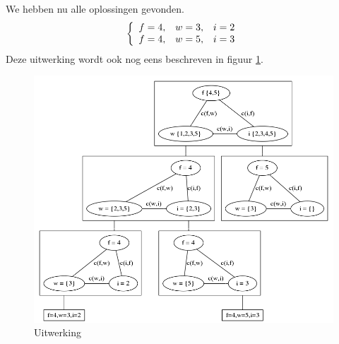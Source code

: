 \documentclass[alternative-exam.tex]{subfiles}
\begin{document}
We hebben nu alle oplossingen gevonden.
\[
\left\lbrace
\begin{array}{c c c}
f=4,& w=3,& i=2\\
f=4,& w=5,& i=3\\
\end{array}
\right.
\] 
Deze uitwerking wordt ook nog eens beschreven in figuur \ref{uitwerking}.
\begin{figure}
[p]
\centering
\caption{Uitwerking}
\label{uitwerking}
\includegraphics[scale=0.4]{resources/graphs/uitwerking.png}
\end{figure}
\end{document}
